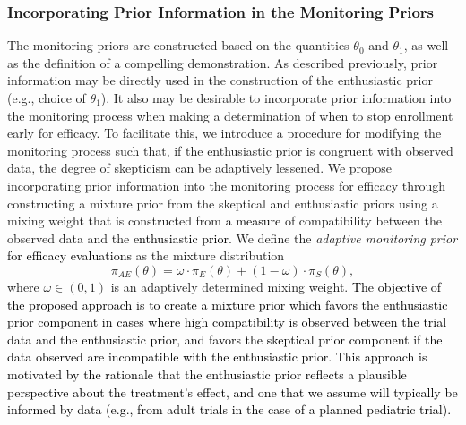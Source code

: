\documentclass[12pt]{article}
\begin{document}
\subsubsection{Incorporating Prior Information in the Monitoring Priors}\label{sec:incorporating}
The monitoring priors are constructed based on the quantities $\theta_0$ and $\theta_1$, as well as the definition of a compelling demonstration. 
%
As described previously, prior information may be directly used in the construction of the enthusiastic prior (e.g., choice of $\theta_1$).
%
It also may be desirable to incorporate prior information into the monitoring process when making a determination of when to stop enrollment 
early for efficacy.
%
To facilitate this, we introduce a procedure for modifying the monitoring process such that, if the enthusiastic prior is congruent with observed data, the degree of skepticism can be adaptively lessened.
We propose incorporating prior information into the monitoring process for efficacy through constructing a mixture prior
from the skeptical and enthusiastic priors using a mixing weight that is constructed from \textcolor{black}{a measure} of compatibility between the
observed data and the \textcolor{black}{enthusiastic prior}. 
We define the \textit{adaptive monitoring prior} \textcolor{black}{for efficacy evaluations} as the mixture distribution	
\begin{equation}\label{eq:inference_prior}
	\pi_{AE}\left(\theta\right)=\omega\cdot\pi_E(\theta)+(1 - \omega)\cdot \pi_S(\theta),
\end{equation}
where $\omega\in(0,1)$ is an adaptively determined mixing weight. %
%
\textcolor{black}{The objective of the proposed approach is to create a mixture prior which favors the enthusiastic prior component in cases where high compatibility is observed between the trial data and the enthusiastic prior, and favors the skeptical prior component if the data observed are incompatible with the enthusiastic prior. This approach is motivated by the rationale that the enthusiastic prior reflects a plausible perspective about the treatment's effect, and one that we assume will typically be informed by data (e.g., from adult trials in the case of a planned pediatric trial).}  
\end{document}
